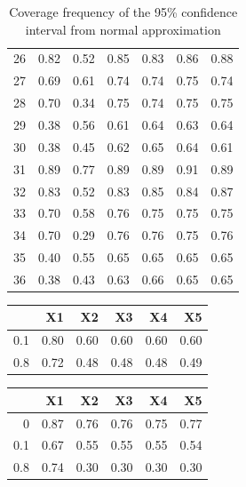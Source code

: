 \documentclass[authoryear, review, 11pt]{elsarticle}
\begin{document}
\begin{table}[ht]
\begin{center}
\begin{tabular}{rrrrrrr}
  26 & 0.82 & 0.52 & 0.85 & 0.83 & 0.86 & 0.88 \\ 
  27 & 0.69 & 0.61 & 0.74 & 0.74 & 0.75 & 0.74 \\ 
  28 & 0.70 & 0.34 & 0.75 & 0.74 & 0.75 & 0.75 \\ 
  29 & 0.38 & 0.56 & 0.61 & 0.64 & 0.63 & 0.64 \\ 
  30 & 0.38 & 0.45 & 0.62 & 0.65 & 0.64 & 0.61 \\ 
  31 & 0.89 & 0.77 & 0.89 & 0.89 & 0.91 & 0.89 \\ 
  32 & 0.83 & 0.52 & 0.83 & 0.85 & 0.84 & 0.87 \\ 
  33 & 0.70 & 0.58 & 0.76 & 0.75 & 0.75 & 0.75 \\ 
  34 & 0.70 & 0.29 & 0.76 & 0.76 & 0.75 & 0.76 \\ 
  35 & 0.40 & 0.55 & 0.65 & 0.65 & 0.65 & 0.65 \\ 
  36 & 0.38 & 0.43 & 0.63 & 0.66 & 0.65 & 0.65 \\ 
   \hline
\end{tabular}
\caption{Coverage frequency of the 95\% confidence interval from normal approximation}
\end{center}
\end{table}


\begin{table}[ht]
\begin{center}
\begin{tabular}{rrrrrr}
  \hline
 & X1 & X2 & X3 & X4 & X5 \\ 
  \hline
0.1 & 0.80 & 0.60 & 0.60 & 0.60 & 0.60 \\ 
  0.8 & 0.72 & 0.48 & 0.48 & 0.48 & 0.49 \\ 
   \hline
\end{tabular}
\end{center}
\end{table}


\begin{table}[ht]
\begin{center}
\begin{tabular}{rrrrrr}
  \hline
 & X1 & X2 & X3 & X4 & X5 \\ 
  \hline
0 & 0.87 & 0.76 & 0.76 & 0.75 & 0.77 \\ 
  0.1 & 0.67 & 0.55 & 0.55 & 0.55 & 0.54 \\ 
  0.8 & 0.74 & 0.30 & 0.30 & 0.30 & 0.30 \\ 
   \hline
\end{tabular}
\end{center}
\end{table}
\end{document}
